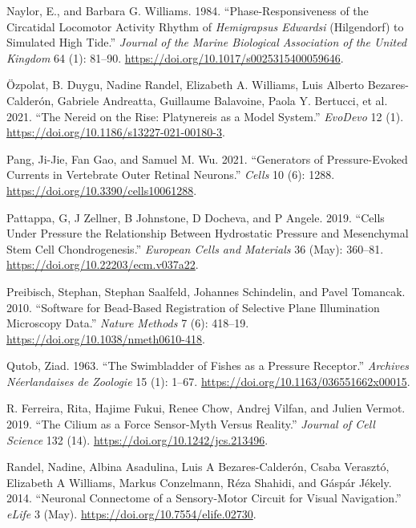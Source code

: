 \documentclass[
]{article}
\newlength{\cslhangindent}
\newlength{\cslentryspacingunit} %
\newenvironment{CSLReferences}[2] %
 {%
  \setlength{\parindent}{0pt}
  \ifodd #1
  \let\oldpar\par
  \def\par{\hangindent=\cslhangindent\oldpar}
  \fi
  \setlength{\parskip}{#2\cslentryspacingunit}
 }%
 {}
\begin{document}
\begin{CSLReferences}{1}{0}
\leavevmode{}%
Naylor, E., and Barbara G. Williams. 1984. {``Phase-Responsiveness of
the Circatidal Locomotor Activity Rhythm of {\emph{Hemigrapsus
Edwardsi}} (Hilgendorf) to Simulated High Tide.''} \emph{Journal of the
Marine Biological Association of the United Kingdom} 64 (1): 81--90.
\url{https://doi.org/10.1017/s0025315400059646}.

\leavevmode{}%
Özpolat, B. Duygu, Nadine Randel, Elizabeth A. Williams, Luis Alberto
Bezares-Calderón, Gabriele Andreatta, Guillaume Balavoine, Paola Y.
Bertucci, et al. 2021. {``The Nereid on the Rise: Platynereis as a Model
System.''} \emph{EvoDevo} 12 (1).
\url{https://doi.org/10.1186/s13227-021-00180-3}.

\leavevmode{}%
Pang, Ji-Jie, Fan Gao, and Samuel M. Wu. 2021. {``Generators of
Pressure-Evoked Currents in Vertebrate Outer Retinal Neurons.''}
\emph{Cells} 10 (6): 1288. \url{https://doi.org/10.3390/cells10061288}.

\leavevmode{}%
Pattappa, G, J Zellner, B Johnstone, D Docheva, and P Angele. 2019.
{``Cells Under Pressure {\textendash} the Relationship Between
Hydrostatic Pressure and Mesenchymal Stem Cell Chondrogenesis.''}
\emph{European Cells and Materials} 36 (May): 360--81.
\url{https://doi.org/10.22203/ecm.v037a22}.

\leavevmode{}%
Preibisch, Stephan, Stephan Saalfeld, Johannes Schindelin, and Pavel
Tomancak. 2010. {``Software for Bead-Based Registration of Selective
Plane Illumination Microscopy Data.''} \emph{Nature Methods} 7 (6):
418--19. \url{https://doi.org/10.1038/nmeth0610-418}.

\leavevmode{}%
Qutob, Ziad. 1963. {``The Swimbladder of Fishes as a Pressure
Receptor.''} \emph{Archives Néerlandaises de Zoologie} 15 (1): 1--67.
\url{https://doi.org/10.1163/036551662x00015}.

\leavevmode{}%
R. Ferreira, Rita, Hajime Fukui, Renee Chow, Andrej Vilfan, and Julien
Vermot. 2019. {``The Cilium as a Force Sensor{-}Myth Versus Reality.''}
\emph{Journal of Cell Science} 132 (14).
\url{https://doi.org/10.1242/jcs.213496}.

\leavevmode{}%
Randel, Nadine, Albina Asadulina, Luis A Bezares-Calderón, Csaba
Verasztó, Elizabeth A Williams, Markus Conzelmann, Réza Shahidi, and
Gáspár Jékely. 2014. {``Neuronal Connectome of a Sensory-Motor Circuit
for Visual Navigation.''} \emph{eLife} 3 (May).
\url{https://doi.org/10.7554/elife.02730}.


\end{CSLReferences}
\end{document}
